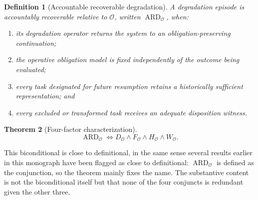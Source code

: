 \documentclass[11pt]{report}
\newtheorem{definition}{Definition}[chapter]
\newtheorem{theorem}[definition]{Theorem}
\begin{document}
\begin{definition}[Accountable recoverable degradation]
A degradation episode is accountably recoverable relative to $\mathcal O$, written $\operatorname{ARD}_{\mathcal O}$, when:
\begin{enumerate}
\item[$D_{\mathcal O}$:] its degradation operator returns the system to an obligation-preserving continuation;
\item[$F_{\mathcal O}$:] the operative obligation model is fixed independently of the outcome being evaluated;
\item[$H_{\mathcal O}$:] every task designated for future resumption retains a historically sufficient representation; and
\item[$W_{\mathcal O}$:] every excluded or transformed task receives an adequate disposition witness.
\end{enumerate}
\end{definition}

\begin{theorem}[Four-factor characterization]
\[
\operatorname{ARD}_{\mathcal O} \iff D_{\mathcal O} \land F_{\mathcal O} \land H_{\mathcal O} \land W_{\mathcal O}.
\]
\end{theorem}

This biconditional is close to definitional, in the same sense several results earlier in this monograph have been flagged as close to definitional: $\operatorname{ARD}_{\mathcal O}$ is defined as the conjunction, so the theorem mainly fixes the name. The substantive content is not the biconditional itself but that none of the four conjuncts is redundant given the other three.
\end{document}
